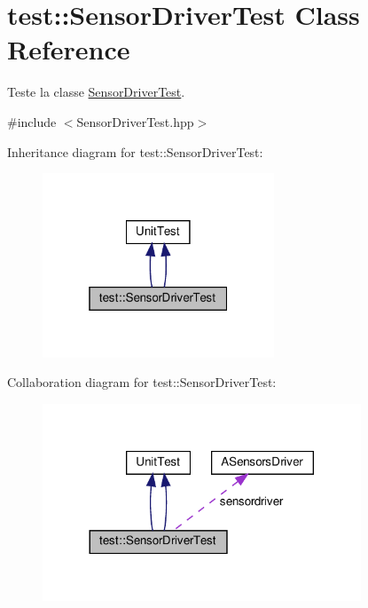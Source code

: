 \hypertarget{classtest_1_1SensorDriverTest}{}\section{test\+:\+:Sensor\+Driver\+Test Class Reference}
\label{classtest_1_1SensorDriverTest}


Teste la classe \hyperlink{classtest_1_1SensorDriverTest}{Sensor\+Driver\+Test}.  




{\ttfamily \#include $<$Sensor\+Driver\+Test.\+hpp$>$}



Inheritance diagram for test\+:\+:Sensor\+Driver\+Test\+:
\nopagebreak
\begin{figure}[H]
\begin{center}
\leavevmode
\includegraphics[width=196pt]{classtest_1_1SensorDriverTest__inherit__graph}
\end{center}
\end{figure}


Collaboration diagram for test\+:\+:Sensor\+Driver\+Test\+:
\nopagebreak
\begin{figure}[H]
\begin{center}
\leavevmode
\includegraphics[width=269pt]{classtest_1_1SensorDriverTest__coll__graph}
\end{center}
\end{figure}
